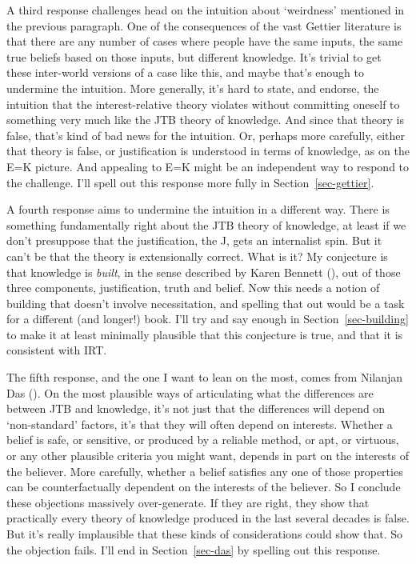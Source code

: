 \documentclass[
  10pt,
  letterpaper,
  twoside]{scrbook}
\begin{document}
A third response challenges head on the intuition about `weirdness'
mentioned in the previous paragraph. One of the consequences of the vast
Gettier literature is that there are any number of cases where people
have the same inputs, the same true beliefs based on those inputs, but
different knowledge. It's trivial to get these inter-world versions of a
case like this, and maybe that's enough to undermine the intuition. More
generally, it's hard to state, and endorse, the intuition that the
interest-relative theory violates without committing oneself to
something very much like the JTB theory of knowledge. And since that
theory is false, that's kind of bad news for the intuition. Or, perhaps
more carefully, either that theory is false, or justification is
understood in terms of knowledge, as on the E=K picture. And appealing
to E=K might be an independent way to respond to the challenge. I'll
spell out this response more fully in Section~\ref{sec-gettier}.

A fourth response aims to undermine the intuition in a different way.
There is something fundamentally right about the JTB theory of
knowledge, at least if we don't presuppose that the justification, the
J, gets an internalist spin. But it can't be that the theory is
extensionally correct. What is it? My conjecture is that knowledge is
\emph{built}, in the sense described by Karen Bennett
(), out of those three components,
justification, truth and belief. Now this needs a notion of building
that doesn't involve necessitation, and spelling that out would be a
task for a different (and longer!) book. I'll try and say enough in
Section~\ref{sec-building} to make it at least minimally plausible that
this conjecture is true, and that it is consistent with IRT.

The fifth response, and the one I want to lean on the most, comes from
Nilanjan Das (). On the most plausible
ways of articulating what the differences are between JTB and knowledge,
it's not just that the differences will depend on `non-standard'
factors, it's that they will often depend on interests. Whether a belief
is safe, or sensitive, or produced by a reliable method, or apt, or
virtuous, or any other plausible criteria you might want, depends in
part on the interests of the believer. More carefully, whether a belief
satisfies any one of those properties can be counterfactually dependent
on the interests of the believer. So I conclude these objections
massively over-generate. If they are right, they show that practically
every theory of knowledge produced in the last several decades is false.
But it's really implausible that these kinds of considerations could
show that. So the objection fails. I'll end in Section~\ref{sec-das} by
spelling out this response.
\end{document}
